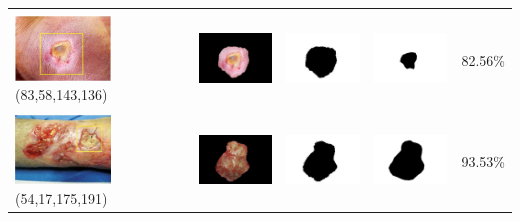 \begin{table}[H]
\begin{tabular}{|m{1.0in}|m{1.0in}|m{1.0in}|m{1.0in}|m{0.6in}|}
		&  &  & \\
		\includegraphics[width=1.0in]{gambar/hasil_segmentasi/luka_kuning/image_21_rect.jpg} {\centering\fontsize{10}{10}\selectfont(83,58,143,136)}&
		\includegraphics[width=1.0in]{gambar/hasil_segmentasi/luka_kuning/result_21.jpg}&
		\includegraphics[width=1.0in]{gambar/hasil_segmentasi/luka_kuning/mask_r_21.jpg}&
		\includegraphics[width=1.0in]{gambar/hasil_segmentasi/luka_kuning/21_r.jpg}&
		82.56\% \\
		\hline

		
		&  &  & \\
		\includegraphics[width=1.0in]{gambar/hasil_segmentasi/luka_kuning/image_13_rect.jpg} {\centering\fontsize{10}{10}\selectfont(54,17,175,191)}&
		\includegraphics[width=1.0in]{gambar/hasil_segmentasi/luka_kuning/result_23.jpg}&
		\includegraphics[width=1.0in]{gambar/hasil_segmentasi/luka_kuning/mask_r_23.jpg}&
		\includegraphics[width=1.0in]{gambar/hasil_segmentasi/luka_kuning/23_r.jpg}&
		93.53\% \\
		\hline

	\end{tabular}
\end{table}

